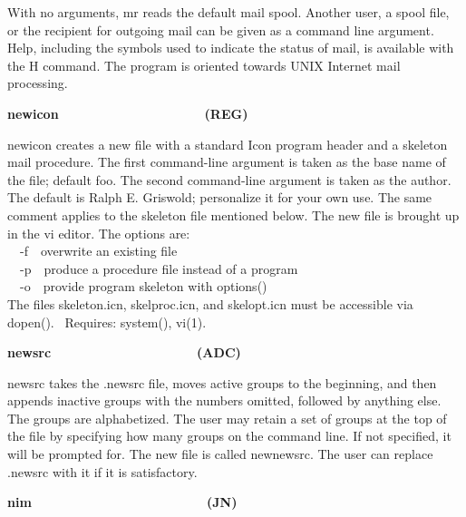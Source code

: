 With no arguments, \textsf{mr} reads the default mail
spool. Another user, a spool file, or the recipient for outgoing mail
can be given as a command line argument. Help, including the symbols
used to indicate the status of mail, is available with the H command.
The program is oriented towards UNIX Internet mail processing.

{\sffamily\bfseries
newicon\ \ \ \ \ \ \ \ \ \ \ \ \ \ \ \ \ \ \ \ (REG)}

\textsf{newicon} creates a new file with a standard Icon program header
and a skeleton mail procedure. The first command-line argument is taken
as the base name of the file; default
{\textquotedbl}foo{\textquotedbl}. The second command-line argument is
taken as the author. The default is {\textquotedbl}Ralph E.
Griswold{\textquotedbl}; personalize it for your own use. The same
comment applies to the skeleton file mentioned below.
The new file is brought up in the vi editor. The options
are:\\
\ \ \textsf{{}-f}\ \ overwrite an existing file\\
\ \ \textsf{{}-p}\ \ produce a procedure file instead of a
program\\
\ \ \textsf{{}-o}\ \ provide program skeleton with
\textsf{options()}\\
The files \textsf{skeleton.icn}, \textsf{skelproc.icn}, and
\textsf{skelopt.icn} must be accessible via \textsf{dopen()}.
\ Requires: system(), vi(1).

{\sffamily\bfseries
newsrc\ \ \ \ \ \ \ \ \ \ \ \ \ \ \ \ \ \ \ \ (ADC)}

\textsf{news}\textsf{rc} takes the \textsf{.newsrc} file,
moves active groups to the beginning, and then appends inactive groups
with the numbers omitted, followed by anything else. The groups are
alphabetized. The user may retain a set of groups at the top of the
file by specifying how many groups on the command line. If not
specified, it will be prompted for. The new file is called newnewsrc.
The user can replace .newsrc with it if it is satisfactory. 

{\sffamily\bfseries
nim\ \ \ \ \ \ \ \ \ \ \ \ \ \ \ \ \ \ \ \ \ \  \ \ (JN)}

